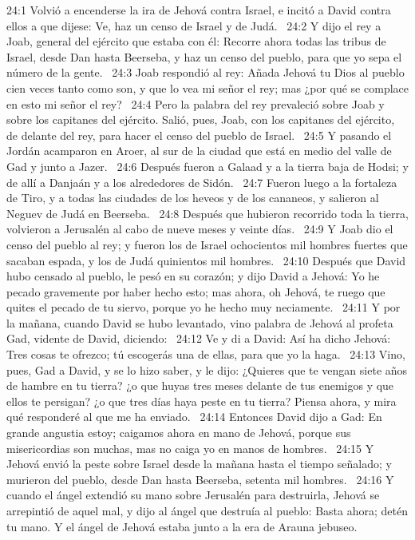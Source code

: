24:1 Volvió a encenderse la ira de Jehová contra Israel, e incitó a David contra ellos a que dijese: Ve, haz un censo de Israel y de Judá.  
24:2 Y dijo el rey a Joab, general del ejército que estaba con él: Recorre ahora todas las tribus de Israel, desde Dan hasta Beerseba, y haz un censo del pueblo, para que yo sepa el número de la gente.  
24:3 Joab respondió al rey: Añada Jehová tu Dios al pueblo cien veces tanto como son, y que lo vea mi señor el rey; mas ¿por qué se complace en esto mi señor el rey?  
24:4 Pero la palabra del rey prevaleció sobre Joab y sobre los capitanes del ejército. Salió, pues, Joab, con los capitanes del ejército, de delante del rey, para hacer el censo del pueblo de Israel.  
24:5 Y pasando el Jordán acamparon en Aroer, al sur de la ciudad que está en medio del valle de Gad y junto a Jazer.  
24:6 Después fueron a Galaad y a la tierra baja de Hodsi; y de allí a Danjaán y a los alrededores de Sidón.  
24:7 Fueron luego a la fortaleza de Tiro, y a todas las ciudades de los heveos y de los cananeos, y salieron al Neguev de Judá en Beerseba.  
24:8 Después que hubieron recorrido toda la tierra, volvieron a Jerusalén al cabo de nueve meses y veinte días.  
24:9 Y Joab dio el censo del pueblo al rey; y fueron los de Israel ochocientos mil hombres fuertes que sacaban espada, y los de Judá quinientos mil hombres.  
24:10 Después que David hubo censado al pueblo, le pesó en su corazón; y dijo David a Jehová: Yo he pecado gravemente por haber hecho esto; mas ahora, oh Jehová, te ruego que quites el pecado de tu siervo, porque yo he hecho muy neciamente.  
24:11 Y por la mañana, cuando David se hubo levantado, vino palabra de Jehová al profeta Gad, vidente de David, diciendo:  
24:12 Ve y di a David: Así ha dicho Jehová: Tres cosas te ofrezco; tú escogerás una de ellas, para que yo la haga.  
24:13 Vino, pues, Gad a David, y se lo hizo saber, y le dijo: ¿Quieres que te vengan siete años de hambre en tu tierra? ¿o que huyas tres meses delante de tus enemigos y que ellos te persigan? ¿o que tres días haya peste en tu tierra? Piensa ahora, y mira qué responderé al que me ha enviado.  
24:14 Entonces David dijo a Gad: En grande angustia estoy; caigamos ahora en mano de Jehová, porque sus misericordias son muchas, mas no caiga yo en manos de hombres.  
24:15 Y Jehová envió la peste sobre Israel desde la mañana hasta el tiempo señalado; y murieron del pueblo, desde Dan hasta Beerseba, setenta mil hombres.  
24:16 Y cuando el ángel extendió su mano sobre Jerusalén para destruirla, Jehová se arrepintió de aquel mal, y dijo al ángel que destruía al pueblo: Basta ahora; detén tu mano. Y el ángel de Jehová estaba junto a la era de Arauna jebuseo. 
